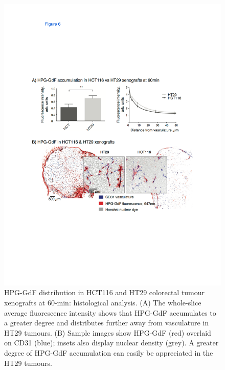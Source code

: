 \begin{figure}[htbp]
 \begin{center}
 \includegraphics[width=\textwidth]{hpg/hpg-paper1-images/hpg_fig6-accumulation.pdf}
 \caption{HPG-GdF distribution in HCT116 and HT29 colorectal tumour xenografts at 60-min: histological analysis.
 (A) The whole-slice average fluorescence intensity shows that \acs{HPG-GdF} accumulates to a greater degree and distributes further away from vasculature in HT29 tumours.
 (B) Sample images show \acs{HPG-GdF} (red) overlaid on \acs{CD31} (blue); insets also display nuclear density (grey).
 A greater degree of \acs{HPG-GdF} accumulation can easily be appreciated in the HT29 tumours.}
 \label{hpgpaper1:fig6}
 \end{center}
\end{figure}

